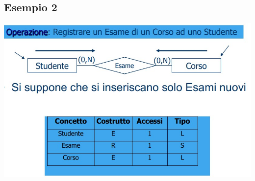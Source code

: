 \subsection{Esempio 2}
\begin{center}
    \includegraphics[scale=0.675]{chaptersLezioniSara/img/PLog_tavolaAccessi_es2.jpg}
\end{center}

